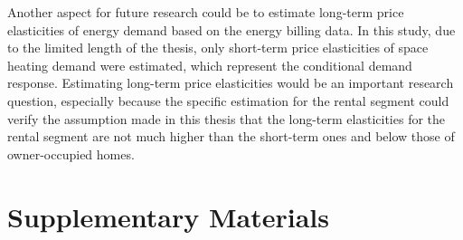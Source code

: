 \documentclass[12pt,twoside]{reedthesis}
\begin{document}
Another aspect for future research could be to estimate long-term price elasticities of energy demand based on the energy billing data. In this study, due to the limited length of the thesis, only short-term price elasticities of space heating demand were estimated, which represent the conditional demand response. Estimating long-term price elasticities would be an important research question, especially because the specific estimation for the rental segment could verify the assumption made in this thesis that the long-term elasticities for the rental segment are not much higher than the short-term ones and below those of owner-occupied homes.

\appendix

\hypertarget{supplementary-materials}{%
\chapter{Supplementary Materials}\label{supplementary-materials}}
\end{document}
